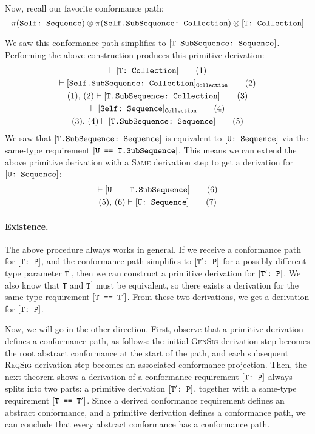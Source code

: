 \documentclass[../generics]{subfiles}
\begin{document}
Now, recall our favorite conformance path:
\[\pi(\texttt{Self:~Sequence}) \otimes \pi(\texttt{Self.SubSequence:~Collection}) \otimes [\texttt{T:~Collection}]\]

We saw this conformance path simplifies to $[\texttt{T.SubSequence:~Sequence}]$. Performing the above construction produces this primitive derivation:
\begin{gather*}
\vdash[\texttt{T:~Collection}]\tag{1}\\
\vdash[\texttt{Self.SubSequence:~Collection}]_\texttt{Collection}\tag{2}\\
(1),\,(2)\vdash[\texttt{T.SubSequence:~Collection}]\tag{3}\\
\vdash[\texttt{Self:~Sequence}]_\texttt{Collection}\tag{4}\\
(3),\,(4)\vdash[\texttt{T.SubSequence:~Sequence}]\tag{5}
\end{gather*}
We saw that $[\texttt{T.SubSequence:~Sequence}]$ is equivalent to $[\texttt{U:~Sequence}]$ via the same-type requirement $[\texttt{U == T.SubSequence}]$. This means we can extend the above primitive derivation with a \textsc{Same} derivation step to get a derivation for $[\texttt{U:~Sequence}]$:
\begin{gather*}
\vdash[\texttt{U == T.SubSequence}]\tag{6}\\
(5),\,(6)\vdash[\texttt{U:~Sequence}]\tag{7}
\end{gather*}

\paragraph{Existence.} The above procedure always works in general. If we receive a conformance path for $[\texttt{T:~P}]$, and the conformance path simplifies to $[\texttt{$\texttt{T}^\prime$:~P}]$ for a possibly different type parameter $\texttt{T}^\prime$,
then we can construct a primitive derivation for $[\texttt{$\texttt{T}^\prime$:~P}]$. We also know that \texttt{T} and $\texttt{T}^\prime$ must be equivalent, so there exists a derivation for the same-type requirement $[\texttt{T == $\texttt{T}^\prime$}]$. From these two derivations, we get a derivation for $[\texttt{T:~P}]$.

Now, we will go in the other direction. First, observe that a primitive derivation defines a conformance path, as follows: the initial \textsc{GenSig} derivation step becomes the root abstract conformance at the start of the path, and each subsequent \textsc{ReqSig} derivation step becomes an associated conformance projection. Then, the next theorem shows a derivation of a conformance requirement $[\texttt{T:~P}]$ always splits into two parts: a primitive derivation $[\texttt{$\texttt{T}^\prime$:~P}]$, together with a same-type requirement $[\texttt{T == $\texttt{T}^\prime$}]$. Since a derived conformance requirement defines an abstract conformance, and a primitive derivation defines a conformance path, we can conclude that every abstract conformance has a conformance path. 
\end{document}
